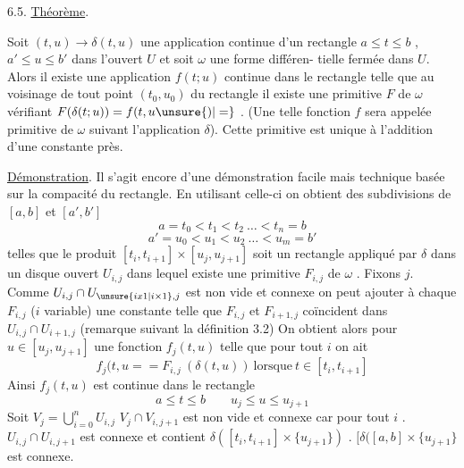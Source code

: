
6.5. \uline{Théorème}.

Soit $(t,u) \to \delta(t,u)$ une application continue d'un rectangle
$a \leq t \leq b$ , $a' \leq u \leq b'$ dans l'ouvert $U$ et soit $\omega$ une forme différen-%
tielle fermée dans $U$. Alors il existe une application $f(t;u)$ continue dans
le rectangle telle que au voisinage de tout point $(t_0,u_0)$ du rectangle
il existe une primitive $F$ de $\omega$ vérifiant $F(\delta(t;u)) = f(t,u\unsure{)|=}$ .
(Une telle fonction $f$ sera appelée primitive de $\omega$ suivant l'application $\delta$).
Cette primitive est unique à l'addition d'une constante près.

\uline{Démonstration}. Il s'agit encore d'une démonstration facile mais technique
basée sur la compacité du rectangle. En utilisant celle-ci on obtient des
subdivisions de $[a,b]$ et $[a',b']$
\[ a = t_0 < t_1 < t_2 \ \dots < t_n = b \]
\[ a' = u_0 < u_1 < u_2 \ \dots < u_m = b' \]
telles que le produit $[t_i, t_{i+1}] \times [u_j, u_{j+1}]$ soit un rectangle appliqué
par $\delta$ dans un disque ouvert $U_{i,j}$ dans lequel existe une primitive $F_{i,j}$
de $\omega$ . Fixons $j$. Comme $U_{i,j} \cap U_{\unsure{ix1|i\times 1},j}$ est non vide et connexe on peut
ajouter à chaque $F_{i,j}$ ($i$ variable) une constante telle que $F_{i,j}$ et
$F_{i+1,j}$ coïncident dans $U_{i,j} \cap U_{i+1, j}$ (remarque suivant la définition 3.2)
On obtient alors pour $u \in [u_j, u_{j+1}]$ une fonction $f_j(t,u)$ telle que
pour tout $i$ on ait
\[ f_j(t,u= = F_{i,j} \ (\delta(t,u)) \ \text{lorsque} \ t \in [t_i, t_{i+1}] \]
Ainsi $f_j(t,u)$ est continue dans le rectangle
\[ a \leq t \leq b \qquad u_j \leq u \leq u_{j+1} \]
Soit $V_j = \bigcup_{i=0}^{n} U_{i,j}$
$V_j \cap V_{i,j+1}$ est non vide et connexe car pour tout $i$ . $U_{i,j} \cap U_{i,j+1}$ est
connexe et contient $\delta([t_i,t_{i+1}] \times \{u_{j+1}\})$ . $[\delta([a,b] \times \{u_{j+1}\}$ est connexe.

